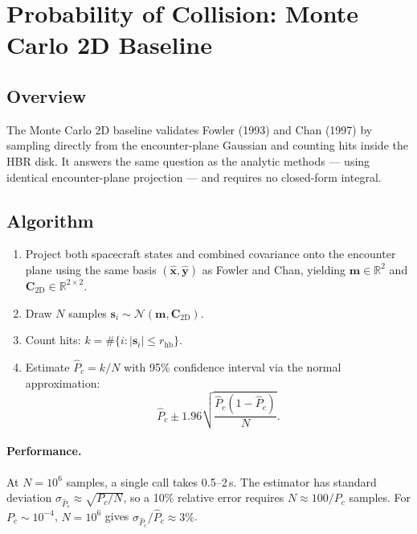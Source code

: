 \documentclass[11pt]{article}
\begin{document}
\section{Probability of Collision: Monte Carlo 2D Baseline}
\label{sec:mc2d}

\subsection{Overview}

The Monte Carlo 2D baseline validates Fowler (1993) and Chan (1997) by sampling
directly from the encounter-plane Gaussian and counting hits inside the HBR
disk.  It answers the same question as the analytic methods — using identical
encounter-plane projection — and requires no closed-form integral.

\subsection{Algorithm}

\begin{enumerate}
  \item Project both spacecraft states and combined covariance onto the
        encounter plane using the same basis $(\hat{\mathbf{x}}, \hat{\mathbf{y}})$
        as Fowler and Chan, yielding $\mathbf{m} \in \mathbb{R}^2$ and
        $\mathbf{C}_\text{2D} \in \mathbb{R}^{2\times2}$.
  \item Draw $N$ samples $\mathbf{s}_i \sim \mathcal{N}(\mathbf{m},
        \mathbf{C}_\text{2D})$.
  \item Count hits: $k = \#\{i : |\mathbf{s}_i| \le r_\text{hb}\}$.
  \item Estimate $\hat{P}_c = k/N$ with 95\% confidence interval via the
        normal approximation:
        \begin{equation}
          \hat{P}_c \pm 1.96\sqrt{\frac{\hat{P}_c(1-\hat{P}_c)}{N}}.
        \end{equation}
\end{enumerate}

\paragraph{Performance.}
At $N = 10^6$ samples, a single call takes 0.5--2\,s.  The estimator has
standard deviation $\sigma_{\hat{P}_c} \approx \sqrt{P_c/N}$, so a 10\%
relative error requires $N \approx 100/P_c$ samples.  For $P_c \sim 10^{-4}$,
$N = 10^6$ gives $\sigma_{\hat{P}_c}/\hat{P}_c \approx 3\%$.
\end{document}
